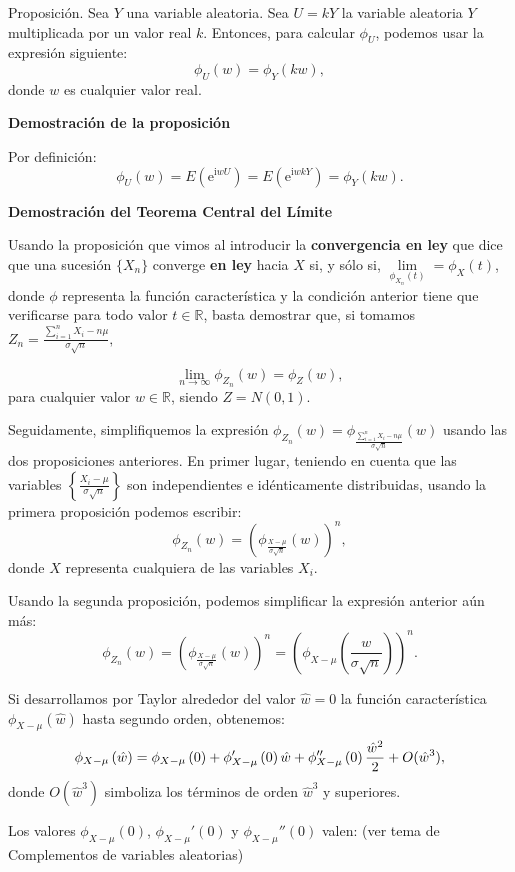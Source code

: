 \documentclass[]{book}
\begin{document}
Proposición.
Sea \(Y\) una variable aleatoria. Sea \(U=kY\) la variable aleatoria \(Y\) multiplicada por un valor real \(k\). Entonces, para calcular \(\phi_{U}\), podemos usar la expresión siguiente:
\[
\phi_{U}(w)=\phi_Y(kw),
\]
donde \(w\) es cualquier valor real.

\textbf{Demostración de la proposición}

Por definición:
\[
\phi_{U}(w)=E\left(\mathrm{e}^{\mathrm{i} w U}\right) = E\left(\mathrm{e}^{\mathrm{i} w k Y}\right)=\phi_Y(kw).
\]

\textbf{Demostración del Teorema Central del Límite}

Usando la proposición que vimos al introducir la \textbf{convergencia en ley} que dice que una sucesión \(\{X_n\}\) converge \textbf{en ley} hacia \(X\) si, y sólo si, \(\lim\limits_{\phi_{X_n}(t)}=\phi_{X}(t)\), donde \(\phi\) representa la función característica y la condición anterior tiene que verificarse para todo valor \(t\in\mathbb{R}\), basta demostrar que, si tomamos
\(Z_n = \frac{\sum\limits_{i=1}^n X_i-n\mu}{\sigma\sqrt{n}},\)

\[
\lim_{n\to \infty}\phi_{Z_n}(w)=\phi_Z(w),
\]
para cualquier valor \(w\in\mathbb{R}\), siendo \(Z=N(0,1)\).

Seguidamente, simplifiquemos la expresión \(\phi_{Z_n}(w)=\phi_{\frac{\sum\limits_{i=1}^n X_i-n\mu}{\sigma\sqrt{n}}}(w)\) usando las dos proposiciones anteriores. En primer lugar, teniendo en cuenta que las variables \(\left\{\frac{X_i-\mu}{\sigma\sqrt{n}}\right\}\) son independientes e idénticamente distribuidas, usando la primera proposición podemos escribir:
\[
\phi_{Z_n}(w) = \left(\phi_{\frac{X-\mu}{\sigma\sqrt{n}}}(w)\right)^n,
\]
donde \(X\) representa cualquiera de las variables \(X_i\).

Usando la segunda proposición, podemos simplificar la expresión anterior aún más:
\[
\phi_{Z_n}(w) = \left(\phi_{\frac{X-\mu}{\sigma\sqrt{n}}}(w)\right)^n = \left(\phi_{X-\mu}\left(\frac{w}{\sigma\sqrt{n}}\right)\right)^n.
\]

Si desarrollamos por Taylor alrededor del valor \(\hat{w}=0\) la función característica \(\phi_{X-\mu}\left(\hat{w}\right)\) hasta segundo orden, obtenemos:
\[
\scriptsize{
\phi_{X-\mu}\left(\hat{w}\right) = \phi_{X-\mu}\left(0\right)+ \phi_{X-\mu}'\left(0\right) \hat{w}+ \phi_{X-\mu}''\left(0\right)\frac{\hat{w}^2}{2}+O(\hat{w}^3),
}
\]
donde \(O(\hat{w}^3)\) simboliza los términos de orden \(\hat{w}^3\) y superiores.

Los valores \(\phi_{X-\mu}\left(0\right)\), \(\phi_{X-\mu}'\left(0\right)\) y \(\phi_{X-\mu}''\left(0\right)\) valen: (ver tema de Complementos de variables aleatorias)
\end{document}
